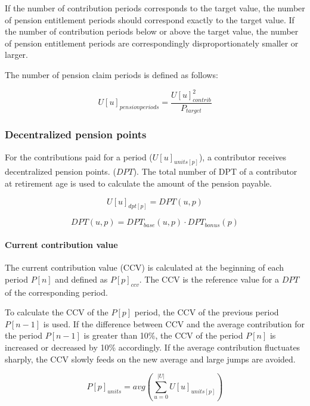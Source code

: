 If the number of contribution periods corresponds to the target value, the number of pension entitlement periods should correspond exactly to the target value. If the number of contribution periods below or above the target value, the number of pension entitlement periods are correspondingly disproportionately smaller or larger.  

The number of pension claim periods is defined as follows:

\begin{equation}
U[u]_{pensionperiods} = \frac{U[u]_{contrib}^2}{P_{target}}
\end{equation}


\subsubsection{Decentralized pension points}
For the contributions paid for a period ($U[u]_{units[p]}$), a contributor receives decentralized pension points.
($DPT$). The total number of DPT of a contributor at retirement age is used to calculate the amount of the pension payable.

\begin{equation}
U[u]_{dpt[p]} = DPT(u, p)
\end{equation}

\begin{equation}
DPT(u, p) = DPT_{base}(u, p) \cdot DPT_{bonus}(p)
\end{equation}

\paragraph*{Current contribution value}
The current contribution value (CCV) is calculated at the beginning of each period $P[n]$ and defined as $P[p]_{ccv}$. The CCV is the reference value for a $DPT$ of the corresponding period.

To calculate the CCV of the $P[p]$ period, the CCV of the previous period $P[n-1]$ is used.
If the difference between CCV and the average contribution for the period $P[n-1]$ is greater than 10\%, the CCV of the period $P[n]$ is increased or decreased by 10\% accordingly.
If the average contribution fluctuates sharply, the CCV slowly feeds on the new average and large jumps are avoided.


\begin{equation}
P[p]_{units} = avg(\sum_{u=0}^{|U|} U[u]_{units[p]})
\end{equation}

